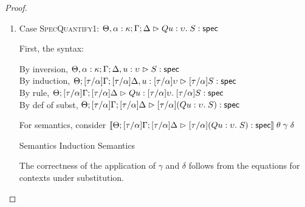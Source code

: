 \begin{proof}
\begin{enumerate}
\item Case \textsc{SpecQuantify1}: $\judgeS[\Theta, \alpha:\kappa; \Gamma; \Delta]{Q u:\upsilon.\;S}$
  
  First, the syntax:
  \begin{tabbedproof}
    \oo By inversion, $\judgeS[\Theta, \alpha:\kappa; \Gamma; \Delta, u:\upsilon]{S}$ \\
    \oo By induction, $\judgeS[\Theta; {[\tau/\alpha]}\Gamma; {[\tau/\alpha]}\Delta, u:{[\tau/\alpha]}\upsilon]{{[\tau/\alpha]}S}$ \\
    \oo By rule, $\judgeS[\Theta; {[\tau/\alpha]}\Gamma; {[\tau/\alpha]}\Delta]
                         {Q u:{[\tau/\alpha]}\upsilon.\;{[\tau/\alpha]}S}$ \\
    \oo By def of subst, $\judgeS[\Theta; {[\tau/\alpha]}\Gamma; {[\tau/\alpha]}\Delta]
                                 {{[\tau/\alpha]}(Q u:\upsilon.\;S)}$ 
  \end{tabbedproof}

  For semantics, consider
  $\interp{\judgeS[\Theta; {[\tau/\alpha]}\Gamma; {[\tau/\alpha]}\Delta]
                  {{[\tau/\alpha]}(Q u:\upsilon.\;S)}}\;\theta\;\gamma\;\delta$ 
  \begin{eqnproof}
          {Semantics}
          {Induction}
          {Semantics}
  \end{eqnproof}

  The correctness of the application of $\gamma$ and $\delta$ follows from the equations for
  contexts under substitution.



\end{enumerate}
\end{proof}
